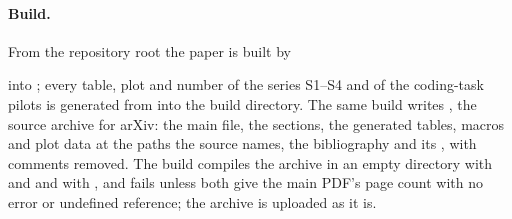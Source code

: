 \paragraph{Build.} From the repository root the paper is built by
\begin{center}\end{center}
into ; every table, plot and number of the series S1--S4 and of the coding-task pilots
is generated from  into the build directory.
The same build writes , the source archive
for arXiv: the main file, the sections, the generated tables, macros and plot data at the paths the
source names, the bibliography and its , with comments removed. The build compiles the
archive in an empty directory with  and  and with , and
fails unless both give the main PDF's page count with no error or undefined reference; the archive is
uploaded as it is.
